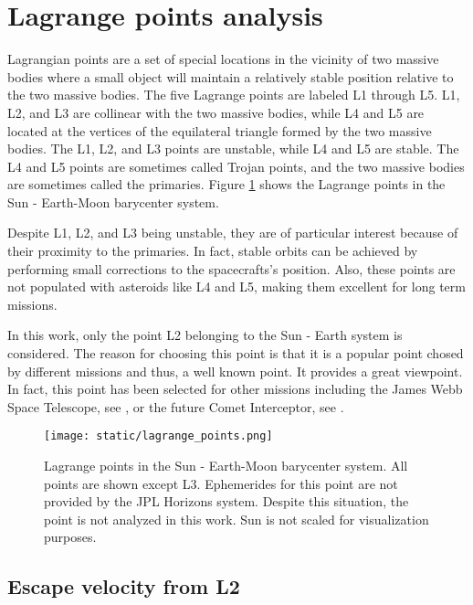 \section{Lagrange points analysis}
\label{sec:lagrange-points-analysis}

Lagrangian points are a set of special locations in the vicinity of two massive
bodies where a small object will maintain a relatively stable position relative
to the two massive bodies. The five Lagrange points are labeled L1 through L5.
L1, L2, and L3 are collinear with the two massive bodies, while L4 and L5 are
located at the vertices of the equilateral triangle formed by the two massive
bodies. The L1, L2, and L3 points are unstable, while L4 and L5 are stable. The
L4 and L5 points are sometimes called Trojan points, and the two massive bodies
are sometimes called the primaries. Figure \ref{fig:lagrange_points} shows the
Lagrange points in the Sun - Earth-Moon barycenter system.

Despite L1, L2, and L3 being unstable, they are of particular interest because
of their proximity to the primaries. In fact, stable orbits can be achieved
by performing small corrections to the spacecrafts's position. Also, these
points are not populated with asteroids like L4 and L5, making them excellent
for long term missions.

In this work, only the point L2 belonging to the Sun - Earth system is
considered. The reason for choosing this point is that it is a popular point
chosed by different missions and thus, a well known point. It provides a great
viewpoint. In fact, this point has been selected for other missions including
the James Webb Space Telescope, see \cite{gardner2006}, or the future Comet
Interceptor, see \cite{jones2019}.

\begin{figure}[H]
  \centering
  \texttt{[image: static/lagrange\_points.png]}
  \caption[Lagrange points in the Sun - Earth system.]{Lagrange points in the
    Sun - Earth-Moon barycenter system. All points are shown except L3. Ephemerides for this
    point are not provided by the JPL Horizons system. Despite this
    situation, the point is not analyzed in this work. Sun is not scaled for
    visualization purposes.}
  \label{fig:lagrange_points}
\end{figure}

\subsection{Escape velocity from L2}

